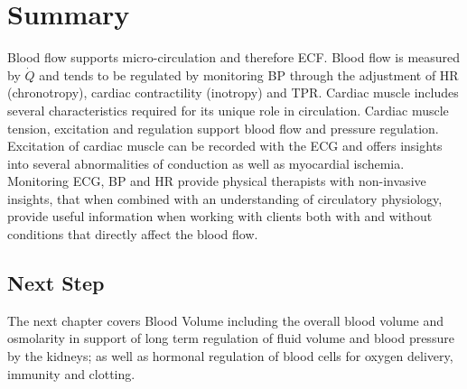 \section{Summary}

Blood flow supports micro-circulation and therefore ECF. Blood flow is measured by $\dot{Q}$ and tends to be regulated by monitoring BP through the adjustment of HR (chronotropy), cardiac contractility (inotropy) and TPR. Cardiac muscle includes several characteristics required for its unique role in circulation. Cardiac muscle tension, excitation and regulation support blood flow and pressure regulation. Excitation of cardiac muscle can be recorded with the ECG and offers insights into several abnormalities of conduction as well as myocardial ischemia. Monitoring ECG, BP and HR provide physical therapists with non-invasive insights, that when combined with an understanding of circulatory physiology, provide useful information when working with clients both with and without conditions that directly affect the blood flow.

\subsection{Next Step}

The next chapter covers Blood Volume including the overall blood volume and osmolarity in support of long term regulation of fluid volume and blood pressure by the kidneys; as well as hormonal regulation of blood cells for oxygen delivery, immunity and clotting.

\printbibliography[heading=subbibintoc]